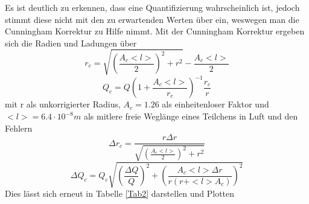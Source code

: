 \documentclass{scrartcl}
\begin{document}
            Es ist deutlich zu erkennen, dass eine Quantifizierung wahrscheinlich ist, jedoch stimmt diese
            nicht mit den zu erwartenden Werten über ein, weswegen man die Cunningham Korrektur zu Hilfe nimmt.
            Mit der Cunningham Korrektur ergeben sich die Radien und Ladungen über
            \begin{equation}
                r_c = \sqrt{(\frac{A_c <l>}{2})^2 + r^2} - \frac{A_c <l>}{2}  
            \end{equation}
            \begin{equation}
                Q_c = Q(1+\frac{A_c<l>}{r_c})^{-1} \frac{r_c}{r}
            \end{equation}
            mit r als unkorrigierter Radius, $A_c=1.26$ als einheitenloser Faktor und $<l>=6.4\cdot 10^{-8} m$ als
            mitlere freie Weglänge eines Teilchens in Luft und den Fehlern
            \begin{equation}
                \Delta r_c = \frac{r \Delta r}{\sqrt{(\frac{A_c <l>}{2})^2 + r^2}}
            \end{equation}
            \begin{equation}
                \Delta Q_c = Q_c \sqrt{(\frac{\Delta Q}{Q})^2 + (\frac{A_c <l> \Delta r}{r(r+<l>A_c)})^2}
            \end{equation}
            Dies lässt sich erneut in Tabelle \ref{Tab2} darstellen und Plotten

            
            
\end{document}
